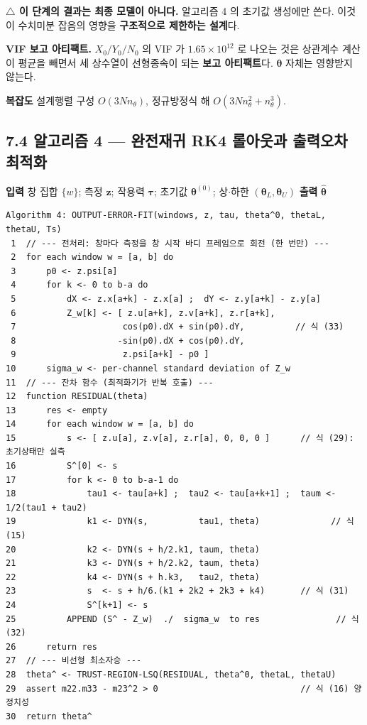 \documentclass[10pt,a4paper]{article}
\begin{document}
\textbf{$\triangle$ 이 단계의 결과는 최종 모델이 아니다.} 알고리즘 4 의 초기값 생성에만 쓴다. 이것이 수치미분 잡음의 영향을 \textbf{구조적으로 제한하는 설계}다.

\textbf{VIF 보고 아티팩트.} $X_0/Y_0/N_0$ 의 VIF 가 $1.65\times10^{12}$ 로 나오는 것은 상관계수 계산이 평균을 빼면서 세 상수열이 선형종속이 되는 \textbf{보고 아티팩트}다. $\boldsymbol{\theta}$ 자체는 영향받지 않는다.

\textbf{복잡도} 설계행렬 구성 $O(3N n_\theta)$, 정규방정식 해 $O(3N n_\theta^2 + n_\theta^3)$.

\subsection*{7.4 알고리즘 4 --- 완전재귀 RK4 롤아웃과 출력오차 최적화}

\textbf{입력} 창 집합 $\{w\}$; 측정 $\mathbf{z}$; 작용력 $\boldsymbol{\tau}$; 초기값 $\boldsymbol{\theta}^{(0)}$; 상$\cdot$하한 $(\boldsymbol{\theta}_L, \boldsymbol{\theta}_U)$ \textbf{출력} $\hat{\boldsymbol{\theta}}$

\begin{Verbatim}[fontsize=\small,frame=single,framesep=2.2mm,rulecolor=\color{black!35}]
Algorithm 4: OUTPUT-ERROR-FIT(windows, z, tau, theta^0, thetaL, thetaU, Ts)
 1  // --- 전처리: 창마다 측정을 창 시작 바디 프레임으로 회전 (한 번만) ---
 2  for each window w = [a, b] do
 3      p0 <- z.psi[a]
 4      for k <- 0 to b-a do
 5          dX <- z.x[a+k] - z.x[a] ;  dY <- z.y[a+k] - z.y[a]
 6          Z_w[k] <- [ z.u[a+k], z.v[a+k], z.r[a+k],
 7                     cos(p0).dX + sin(p0).dY,          // 식 (33)
 8                    -sin(p0).dX + cos(p0).dY,
 9                     z.psi[a+k] - p0 ]
10      sigma_w <- per-channel standard deviation of Z_w
11  // --- 잔차 함수 (최적화기가 반복 호출) ---
12  function RESIDUAL(theta)
13      res <- empty
14      for each window w = [a, b] do
15          s <- [ z.u[a], z.v[a], z.r[a], 0, 0, 0 ]      // 식 (29): 초기상태만 실측
16          S^[0] <- s
17          for k <- 0 to b-a-1 do
18              tau1 <- tau[a+k] ;  tau2 <- tau[a+k+1] ;  taum <- 1/2(tau1 + tau2)
19              k1 <- DYN(s,          tau1, theta)              // 식 (15)
20              k2 <- DYN(s + h/2.k1, taum, theta)
21              k3 <- DYN(s + h/2.k2, taum, theta)
22              k4 <- DYN(s + h.k3,   tau2, theta)
23              s  <- s + h/6.(k1 + 2k2 + 2k3 + k4)       // 식 (31)
24              S^[k+1] <- s
25          APPEND (S^ - Z_w)  ./  sigma_w  to res               // 식 (32)
26      return res
27  // --- 비선형 최소자승 ---
28  theta^ <- TRUST-REGION-LSQ(RESIDUAL, theta^0, thetaL, thetaU)
29  assert m22.m33 - m23^2 > 0                            // 식 (16) 양정치성
30  return theta^
\end{Verbatim}
\end{document}
